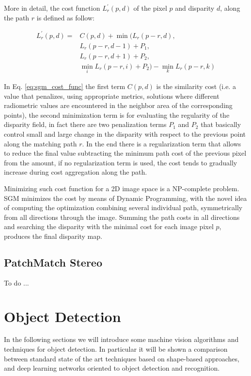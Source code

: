 More in detail, the cost function $L^{\prime}_r(p, d)$ of the pixel $p$ and disparity $d$, along the path $r$ is defined as follow:

\begin{equation}\label{eq:sgm_cost_func}
    \begin{aligned}
    L^{\prime}_r(p, d) = &C(p, d) + 
    \min(L_r(p-r, d), \\
    &L_r(p-r, d-1)+P_1, \\
    &L_r(p-r, d+1)+P_2, \\
    &\min_iL_r(p-r,i)+P_2) - \min_kL_r(p-r,k)
    \end{aligned}
\end{equation}

In Eq. \ref{eq:sgm_cost_func} the first term $C(p, d)$ is the similarity cost (i.e. a value that penalizes, using appropriate metrics, solutions where different radiometric values are encountered in the neighbor area of the corresponding points), the second minimization term is for evaluating the regularity of the disparity field, in fact there are two penalization terms $P_1$ and $P_2$ that basically control small and large change in the disparity with respect to the previous point along the matching path $r$. In the end there is a regularization term that allows to reduce the final value subtracting the minimum path cost of the previous pixel from the amount, if no regularization term is used, the cost tends to gradually increase during cost aggregation along the path.

Minimizing such cost function for a 2D image space is a NP-complete problem. SGM minimizes the cost by means of Dynamic Programming, with the novel idea of computing the optimization combining several individual path, symmetrically from all directions through the image. Summing the path costs in all directions and searching the disparity with the minimal cost for each image pixel $p$, produces the final disparity map.

\subsection{PatchMatch Stereo}\label{subsec:patchmatchstereo}
To do ...

\section{Object Detection}\label{sec:objectdetection}
In the following sections we will introduce some machine vision algorithms and techniques for object detection. In particular it will be shown a comparison between standard state of the art techniques based on shape-based approaches, and deep learning networks oriented to object detection and recognition.

